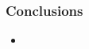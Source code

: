 \begin{frame}
    \frametitle{Conclusions}
    \begin{itemize}
        \item \lipsum[1] 
    \end{itemize}
\end{frame}

